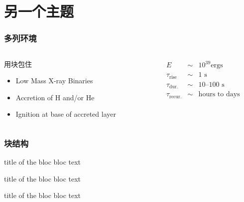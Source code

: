 \documentclass[hyperref={bookmarks=false},CJK]{beamer}
\begin{document}
\section{另一个主题}
\begin{frame}
  \frametitle{多列环境}
  \label{sec-1-2}
  \begin{columns}
    \begin{column}{0.5\textwidth}
      \begin{block}{用块包住}
        \label{sec-1-2-1}

        \begin{itemize}
          \item Low Mass X-ray Binaries
          \item Accretion of H and/or He
          \item Ignition at base of accreted layer
        \end{itemize}
      \end{block}
    \end{column}
    \begin{column}{0.5\textwidth}
      \label{sec-1-2-2}
      \color{UTMRed}
      \begin{eqnarray*}
        E &\sim& 10^{39} \text{ergs}\\
        \tau_\text{rise} &\sim& 1 \text{ s} \\
        \tau_\text{dur.} &\sim& 10\text{--}100\text{ s} \\
        \tau_\text{recur.} &\sim& \text{hours to days}
      \end{eqnarray*}
    \end{column}
  \end{columns}
\end{frame}

\begin{frame}
\frametitle{块结构}
\begin{minipage}{.5\textwidth}
\begin{block}{title of the bloc}
bloc text
\end{block}

\begin{exampleblock}{title of the bloc}
bloc text
\end{exampleblock}

\begin{alertblock}{title of the bloc}
bloc text
\end{alertblock}
\end{minipage}
\end{frame}
\end{document}
